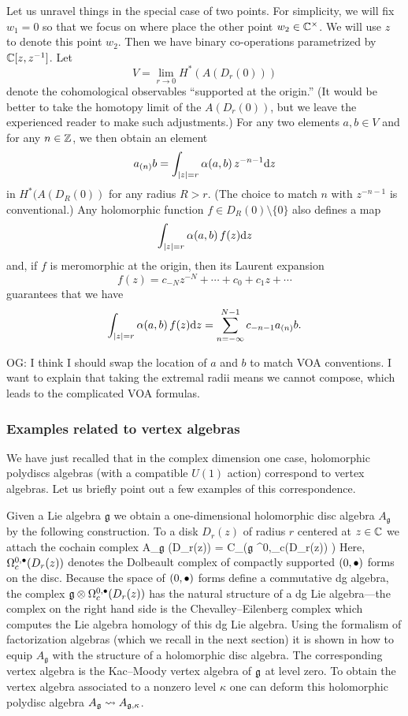\documentclass[11pt]{amsart}
\def\lie#1{\ensuremath{\mathfrak{#1}}}
\def\owen#1{{\textcolor{violet!65!black}{OG: {#1}}}}
\begin{document}
Let us unravel things in the special case of two points.
For simplicity, we will fix $w_1 = 0$ so that we focus on where place the other point $w_2 \in \mathbb C^\times$.
We will use $z$ to denote this point $w_2$.
Then we have binary co-operations parametrized by $\mathbb C[z, z^{-1}]$.
Let 
\[
V = \lim_{r \to 0} H^*(A(D_r(0)))
\]
denote the cohomological observables ``supported at the origin.''
(It would be better to take the homotopy limit of the $A(D_r(0))$,
but we leave the experienced reader to make such adjustments.)
For any two elements $a, b \in V$ and for any $n \in \mathbb Z$,
we then obtain an element
\[
a_{(n)} b = \int_{|z| = r} \alpha(a,b)\, z^{-n-1} {\rm d} z
\]
in $H^*(A(D_R(0))$ for any radius $R > r$.
(The choice to match $n$ with $z^{-n-1}$ is conventional.)
Any holomorphic function $f \in D_R(0) \setminus \{0\}$ also defines a map
\[
\int_{|z| = r} \alpha(a,b)\, f(z) {\rm d} z 
\]
and, if $f$ is meromorphic at the origin, then its Laurent expansion
\[
f(z) = c_{-N} z^{-N} + \cdots + c_0 + c_1 z + \cdots
\]
guarantees that we have
\[
\int_{|z| = r} \alpha(a,b)\, f(z) {\rm d} z = \sum_{n=-\infty}^{N-1} c_{-n-1} a_{(n)} b.
\]

\owen{I think I should swap the location of $a$ and $b$ to match VOA conventions. I want to explain that taking the extremal radii means we cannot compose, which leads to the complicated VOA formulas.}

\subsubsection{Examples related to vertex algebras} 

We have just recalled that in the complex dimension one case, holomorphic  polydiscs algebras (with a compatible $U(1)$ action) correspond to vertex algebras.
Let us briefly point out a few examples of this correspondence.

Given a Lie algebra $\lie{g}$ we obtain a one-dimensional holomorphic disc algebra $A_{\lie{g}}$ by the following construction. 
To a disk $D_r(z)$ of radius $r$ centered at $z \in \mathbb C$ we attach the cochain complex
\beqn
A_{\lie{g}} (D_r(z)) = C_\bu \left(\lie{g} \otimes \Omega^{0,\bu}_c(D_r(z)) \right) 
\eeqn
Here, $\Omega^{0,\bullet}_c(D_r(z))$ denotes the Dolbeault complex of compactly supported $(0,\bullet)$ forms on the disc.
Because the space of $(0,\bullet)$ forms define a commutative dg algebra, 
the complex $\lie{g} \otimes \Omega^{0,\bu}_c(D_r(z))$ has the natural structure of a dg Lie algebra---the complex on the right hand side is the Chevalley--Eilenberg complex which computes the Lie algebra homology of this dg Lie algebra.
Using the formalism of factorization algebras (which we recall in the next section) it is shown in \cite{CG2} how to equip $A_{\lie{g}}$ with the structure of a holomorphic disc algebra.
The corresponding vertex algebra is the Kac--Moody vertex algebra of $\mathfrak g$ at level zero. 
To obtain the vertex algebra associated to a nonzero level $\kappa$ one can deform this holomorphic polydisc algebra $A_{\mathfrak g} \rightsquigarrow A_{\mathfrak g, \kappa}$.
\end{document}
